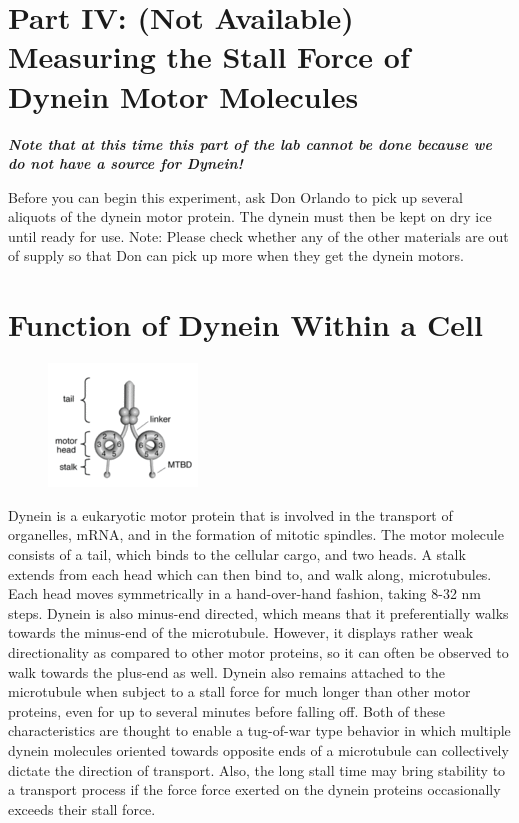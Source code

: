 \documentclass{../lab}
\begin{document}
\section{Part IV: (Not Available) Measuring the Stall Force of Dynein Motor Molecules}

\emph{\textbf{Note that at this time this part of the lab cannot be done because we do not have a source for Dynein!}}

Before you can begin this experiment, ask Don Orlando to pick up several aliquots of the dynein motor protein. The dynein must then be kept on dry ice until ready for use.  Note: Please check whether any of the other materials are out of supply so that Don can pick up more when they get the dynein motors.

\section{Function of Dynein Within a Cell}


\begin{figure}[h]
    \centering
    \href{http://experimentationlab.berkeley.edu/sites/default/files/images/150px-Dynein_Motor.gif}{\includegraphics[width=0.5\linewidth]{images/150px-Dynein_Motor.png}}
    \caption{}
    \label{fig:150px-Dynein_Motor}
\end{figure}

Dynein is a eukaryotic motor protein that is involved in the transport of organelles, mRNA, and in the formation of mitotic spindles. The motor molecule consists of a tail, which binds to the cellular cargo, and two heads. A stalk extends from each head which can then bind to, and walk along, microtubules. Each head moves symmetrically in a hand-over-hand fashion, taking 8-32 nm steps. Dynein is also minus-end directed, which means that it preferentially walks towards the minus-end of the microtubule. However, it displays rather weak directionality as compared to other motor proteins, so it can often be observed to walk towards the plus-end as well. Dynein also remains attached to the microtubule when subject to a stall force for much longer than other motor proteins, even for up to several minutes before falling off. Both of these characteristics are thought to enable a tug-of-war type behavior in which multiple dynein molecules oriented towards opposite ends of a microtubule can collectively dictate the direction of transport. Also, the long stall time may bring stability to a transport process if the force force exerted on the dynein proteins occasionally exceeds their stall force.
\end{document}

